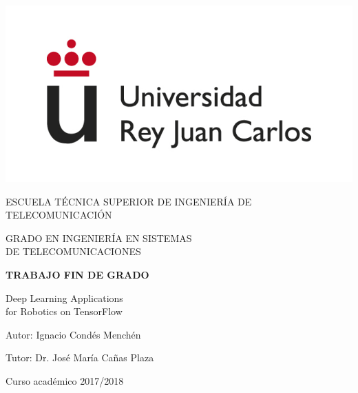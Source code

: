 \begin{titlepage}
	\begin{center}
		\vspace*{7.7mm}
		\includegraphics[width=0.4\linewidth]{images/logo}
		\vspace{6.5mm}
		
		\fontsize{15.5}{14}\selectfont ESCUELA TÉCNICA SUPERIOR DE INGENIERÍA DE TELECOMUNICACIÓN
		\vspace{13mm}
		
		\fontsize{14}{14}\selectfont GRADO EN INGENIERÍA EN SISTEMAS \\ DE TELECOMUNICACIONES
		
		\vspace{70pt}
		
		\fontsize{15.7}{14}\selectfont \textbf{TRABAJO FIN DE GRADO}
		
		\vspace{25mm}
		\begin{huge}
			Deep Learning Applications\\ for Robotics on TensorFlow \\
		\end{huge}
		
		\vspace{25mm}
		
		\begin{large}
			Autor: Ignacio Condés Menchén

			Tutor: Dr. José María Cañas Plaza
		\end{large}
		\begin{normalsize}
			
			Curso académico 2017/2018
		\end{normalsize}
		\vspace{10mm}
	\end{center}
\end{titlepage}

\pagebreak
\thispagestyle{empty}
\vspace*{12cm}

